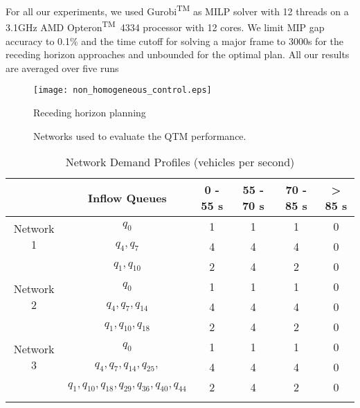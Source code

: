 For all our experiments, we used Gurobi\textsuperscript{TM} as MILP solver with
12 threads on a 3.1GHz AMD Opteron\textsuperscript{TM}~4334 processor with 12
cores.
%
We limit MIP gap accuracy to 0.1\% and the time cutoff for solving a major frame
to 3000s for the receding horizon approaches and unbounded for the optimal plan.
%
%
All our results are averaged over five runs 


\begin{figure*}[t!]
\centering
\texttt{[image: non\_homogeneous\_control.eps]}
\caption{Receding horizon planning}
\label{fig:multiplan}
\end{figure*}


\begin{figure*}[t!]
\centering
\caption{Networks used to evaluate the QTM performance.}
\label{fig:networks}
\end{figure*}

\begin{table}[h]
\caption{Network Demand Profiles (vehicles per second)}
\label{tab:network_demand}
\centering
\begin{tabular}{cccccc}
\toprule
& Inflow Queues & 0 - 55 s & 55 - 70 s & 70 - 85 s & > 85 s\\
\midrule
\multirow{2}{*}{Network 1}&$q_0$ & 1 & 1 & 1 & 0 \\
&$q_4, q_7$ & 4 & 4 & 4 & 0 \\
&$q_1,q_{10}$& 2 & 4 & 2 & 0 \\
\midrule
\multirow{2}{*}{Network 2}&$q_0$ & 1 & 1 & 1 & 0 \\
&$q_4,q_7,q_{14}$& 4 & 4 & 4 & 0 \\
&$q_1, q_{10},q_{18}$ & 2 & 4 & 2 & 0 \\
\midrule
\multirow{2}{*}{Network 3}&$q_0$ & 1 & 1 & 1 & 0 \\
&$q_4,q_7,q_{14},q_{25},$& 4 & 4 & 4 & 0 \\
&$q_1, q_{10},q_{18},q_{29},q_{36},q_{40},q_{44}$ & 2 & 4 & 2 & 0 \\
\bottomrule\\
\end{tabular}
\end{table}




